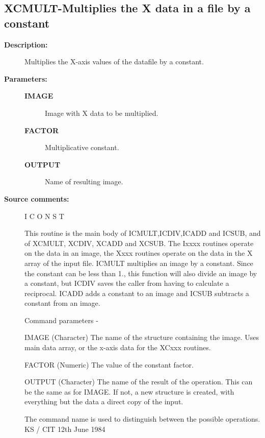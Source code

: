 \subsection{XCMULT-\label{XCMULT}Multiplies the X data in a file by a constant}
\begin{description}

\item [\textbf{Description:}]
 Multiplies the X-axis values of the datafile by a constant.

\item [\textbf{Parameters:}]
\begin{description}
\item [\textbf{IMAGE}]
 Image with X data to be multiplied.
\item [\textbf{FACTOR}]
 Multiplicative constant.
\item [\textbf{OUTPUT}]
 Name of resulting image.
\end{description}

\item [\textbf{Source comments:}]
\begin{terminalv}
 I C O N S T

 This routine is the main body of ICMULT,ICDIV,ICADD and ICSUB,
 and of XCMULT, XCDIV, XCADD and XCSUB.  The Ixxxx routines
 operate on the data in an image, the Xxxx routines operate on
 the data in the X array of the input file.
 ICMULT multiplies an image by a constant.  Since the constant
 can be less than 1., this function will also divide an
 image by a constant, but ICDIV saves the caller from having
 to calculate a reciprocal. ICADD adds a constant to an image and
 ICSUB subtracts a constant from an image.

 Command parameters -

 IMAGE  (Character) The name of the structure containing the image.
        Uses main data array, or the x-axis data for the XCxxx routines.

 FACTOR (Numeric) The value of the constant factor.

 OUTPUT (Character) The name of the result of the operation.  This
        can be the same as for IMAGE.  If not, a new structure
        is created, with everything but the data a direct
        copy of the input.

 The command name is used to distinguish between the
 possible operations.
                                  KS / CIT 12th June 1984
\end{terminalv}
\end{description}

